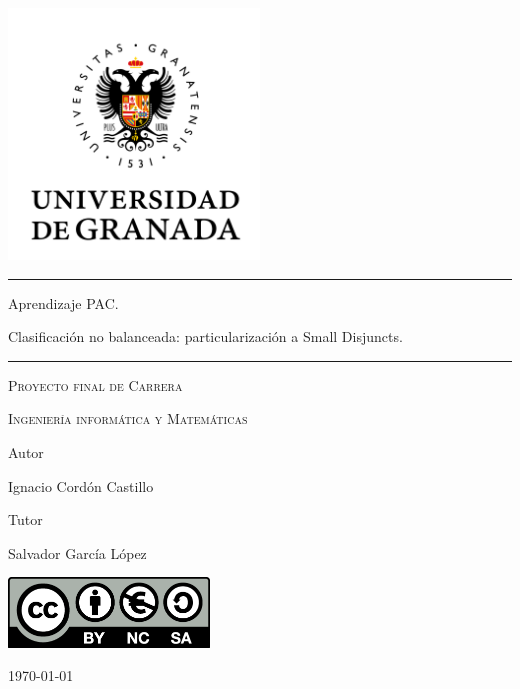 
\begin{titlepage}
	\centering
	\includegraphics[width=0.5\textwidth]{./imgs/ugr.png}\par
        \rule{\textwidth}{0.3em}\hfill
        {\huge 
	  Aprendizaje PAC. \par
	  Clasificación no balanceada:
	  particularización a Small Disjuncts.\par}
        \rule{\textwidth}{0.3em}\hfill
	\vspace{1cm}
        {\scshape Proyecto final de Carrera\par}
        {\scshape Ingeniería informática y Matemáticas\par}
        \vfill
        {Autor \par}
	{Ignacio Cordón Castillo \par}
	{Tutor \par}
	{Salvador García López \par}
	\vfill
      	\includegraphics[width=0.4\textwidth]{./imgs/by-nc-sa.png}\par
	{\large \today\par}
\end{titlepage}